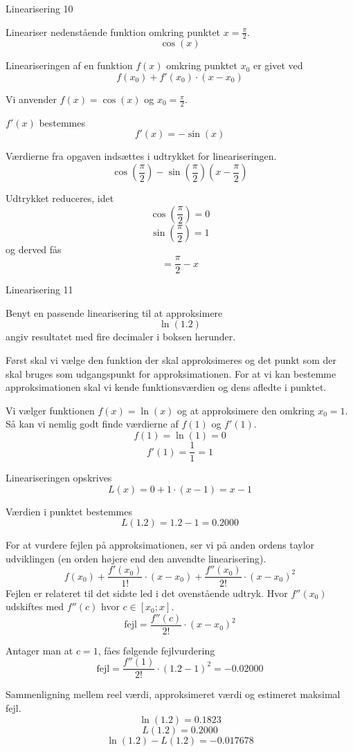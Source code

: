 \documentclass{article}
\begin{document}
\begin{exercise}{Linearisering 10}

Lineariser nedenstående funktion omkring punktet $x = \frac{\pi}{2}$.
\[
\cos(x)
\]


\hint
Lineariseringen af en funktion $f(x)$
omkring punktet $x_0$ er givet ved
\[
f(x_0) + f'(x_0) \cdot (x - x_0)
\]

\hint
Vi anvender $f(x) = \cos(x)$ og $x_0 = \frac{\pi}{2}$.

\hint
$f'(x)$ bestemmes
\[
f'(x) = - \sin(x)
\]

\hint
Værdierne fra opgaven indsættes i udtrykket for lineariseringen.
\[
\cos \left(\frac{\pi}{2}\right) - \sin \left(\frac{\pi}{2} \right) \left(x - \frac{\pi}{2} \right)
\]

\hint
Udtrykket reduceres, idet
\[
\cos\left( \frac{\pi}{2}\right) = 0
\]
\[
\sin\left( \frac{\pi}{2}\right) = 1
\]
og derved fås
\[
= \frac{\pi}{2} - x
\]

\end{exercise}

\begin{exercise}{Linearisering 11}

Benyt en passende linearisering til at approksimere
\[
\ln(1.2)
\]
angiv resultatet med fire decimaler i boksen herunder.

\hint
Først skal vi vælge den funktion der skal approksimeres
og det punkt som der skal bruges som udgangspunkt for
approksimationen.
For at vi kan bestemme approksimationen skal vi
kende funktionsværdien og dens afledte i punktet.

\hint
Vi vælger funktionen $f(x) = \ln(x)$ og at approksimere den
omkring $x_0 = 1$.
Så kan vi nemlig godt finde værdierne af $f(1)$ og $f'(1)$.
\[
f(1) = \ln(1) = 0
\]
\[
f'(1) = \frac{1}{1} = 1
\]

\hint
Lineariseringen opskrives
\[
L(x) = 0 + 1 \cdot (x - 1) = x - 1
\]

\hint
Værdien i punktet bestemmes
\[
L(1.2) = 1.2 - 1 = 0.2000
\]


\hint
For at vurdere fejlen på approksimationen, ser vi på anden
ordens taylor udviklingen (en orden højere end den
anvendte linearisering).
\[
f(x_0)
+ \frac{f'(x_0)}{1!} \cdot (x - x_0)
+ \frac{f''(x_0)}{2!} \cdot (x - x_0)^2
\]
Fejlen er relateret til det sidste led i det ovenstående udtryk.
Hvor $f''(x_0)$ udskiftes med $f''(c)$ hvor $c \in [x_0; x]$.
\[
\textrm{fejl} = \frac{f''(c)}{2!} \cdot (x - x_0)^2
\]

\hint
Antager man at $c = 1$, fåes følgende fejlvurdering
\[
\textrm{fejl} = \frac{f''(1)}{2!} \cdot (1.2 - 1)^2 =
- 0.02000
\]

\hint
Sammenligning mellem reel værdi, approksimeret værdi og estimeret maksimal fejl.
\[
\ln(1.2)= 0.1823
\]
\[
L(1.2) = 0.2000
\]
\[
\ln(1.2) - L(1.2) = -0.017678
\]

\end{exercise}
\end{document}
